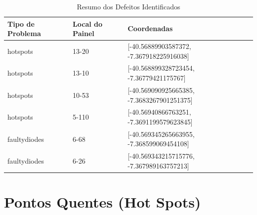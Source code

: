 \documentclass[dvipsnames]{article}%
\begin{document}
%
\FloatBarrier%


\begin{table}[h!]%
\caption{Resumo dos Defeitos Identificados}%
\begin{tabular}{lll}%
\toprule%
Tipo de Problema&Local do Painel&Coordenadas\\%
\midrule%
hotspots&13{-}20&{[}{-}40.56889903587372, {-}7.367918225916038{]}\\%
hotspots&13{-}10&{[}{-}40.568899328723454, {-}7.36779421175767{]}\\%
hotspots&10{-}53&{[}{-}40.569090925665385, {-}7.3683267901251375{]}\\%
hotspots&5{-}110&{[}{-}40.56940866763251, {-}7.3691199579623845{]}\\%
faultydiodes&6{-}68&{[}{-}40.569345265663955, {-}7.368599069454108{]}\\%
faultydiodes&6{-}26&{[}{-}40.569343215715776, {-}7.367989163757213{]}\\%
\bottomrule%
\end{tabular}%
\end{table}

%
\newpage%
\section{Pontos Quentes (Hot Spots)}%
\end{document}
